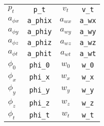 \begin{table}[htb]
\begin{tabular}{l c | c c}
$ p_{t}$ & 		\texttt{p\_t}   	&  $ v_{t}$		& \texttt{v\_t}   \\ 
$ a_{\phi x}$ 	& \texttt{a\_phix}  &  $ a_{wx}$	 & \texttt{a\_wx}   \\
$ a_{\phi y}$ 	& \texttt{a\_phiy}	&  $ a_{wy}$	 & \texttt{a\_wy}   \\
$ a_{\phi z}$ 	& \texttt{a\_phiz}	&  $ a_{wz}$	 & \texttt{a\_wz}   \\ 
$ a_{\phi t}$ 	& \texttt{a\_phit}	&  $ a_{wt}$	 & \texttt{a\_wt}   \\ 
$ \phi_{0}$ 		&  \texttt{phi\_0}	&  $ w_{0}$ 		& \texttt{w\_0}   \\ 
$ \phi_{x}$ 	& \texttt{phi\_x}	&  $ w_{x}$ 	& \texttt{w\_x}   \\
$ \phi_{y}$ 	& \texttt{phi\_y}	&  $ w_{y}$ 	& \texttt{w\_y}   \\ 
$ \phi_{z}$ 	& \texttt{phi\_z}	&  $ w_{z}$ 	& \texttt{w\_z}   \\ 
$ \phi_{t}$ 	& \texttt{phi\_t}	&    $w_{t}$ 	& \texttt{w\_t}  \\
\hline
\end{tabular}
\label{table_aux_var02}
\end{table}






